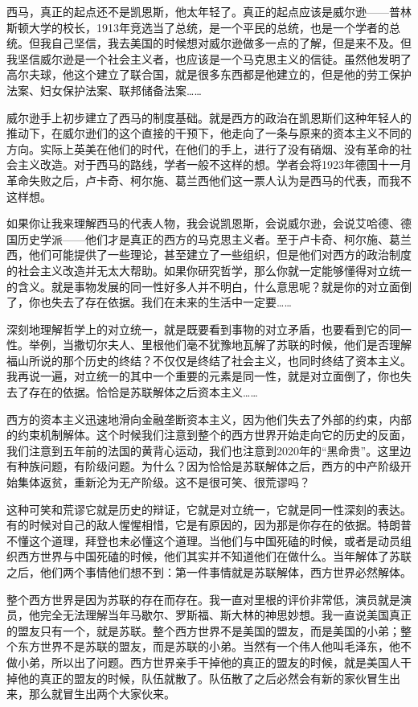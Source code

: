 \documentclass[UTF8, 12pt, a4paper]{ctexrep}
\begin{document}
西马，真正的起点还不是凯恩斯，他太年轻了。真正的起点应该是威尔逊——普林斯顿大学的校长，1913年竞选当了总统，是一个平民的总统，也是一个学者的总统。但我自己坚信，我去美国的时候想对威尔逊做多一点的了解，但是来不及。但我坚信威尔逊是一个社会主义者，也应该是一个马克思主义的信徒。虽然他发明了高尔夫球，他这个建立了联合国，就是很多东西都是他建立的，但是他的劳工保护法案、妇女保护法案、联邦储备法案……

威尔逊手上初步建立了西马的制度基础。就是西方的政治在凯恩斯们这种年轻人的推动下，在威尔逊们的这个直接的干预下，他走向了一条与原来的资本主义不同的方向。实际上英美在他们的时代，在他们的手上，进行了没有硝烟、没有革命的社会主义改造。对于西马的路线，学者一般不这样的想。学者会将1923年德国十一月革命失败之后，卢卡奇、柯尔施、葛兰西他们这一票人认为是西马的代表，而我不这样想。

如果你让我来理解西马的代表人物，我会说凯恩斯，会说威尔逊，会说艾哈德、德国历史学派——他们才是真正的西方的马克思主义者。至于卢卡奇、柯尔施、葛兰西，他们可能提供了一些理论，甚至建立了一些组织，但是他们对西方的政治制度的社会主义改造并无太大帮助。如果你研究哲学，那么你就一定能够懂得对立统一的含义。就是事物发展的同一性好多人并不明白，什么意思呢？就是你的对立面倒了，你也失去了存在依据。我们在未来的生活中一定要……

深刻地理解哲学上的对立统一，就是既要看到事物的对立矛盾，也要看到它的同一性。举例，当撒切尔夫人、里根他们毫不犹豫地瓦解了苏联的时候，他们是否理解福山所说的那个历史的终结？不仅仅是终结了社会主义，也同时终结了资本主义。我再说一遍，对立统一的其中一个重要的元素是同一性，就是对立面倒了，你也失去了存在的依据。恰恰是苏联解体之后资本主义……

西方的资本主义迅速地滑向金融垄断资本主义，因为他们失去了外部的约束，内部的约束机制解体。这个时候我们注意到整个的西方世界开始走向它的历史的反面，我们注意到五年前的法国的黄背心运动，我们也注意到2020年的“黑命贵”。这里边有种族问题，有阶级问题。为什么？因为恰恰是苏联解体之后，西方的中产阶级开始集体返贫，重新沦为无产阶级。这不是很可笑、很荒谬吗？

这种可笑和荒谬它就是历史的辩证，它就是对立统一，它就是同一性深刻的表达。有的时候对自己的敌人惺惺相惜，它是有原因的，因为那是你存在的依据。特朗普不懂这个道理，拜登也未必懂这个道理。当他们与中国死磕的时候，或者是动员组织西方世界与中国死磕的时候，他们其实并不知道他们在做什么。当年解体了苏联之后，他们两个事情他们想不到：第一件事情就是苏联解体，西方世界必然解体。

整个西方世界是因为苏联的存在而存在。我一直对里根的评价非常低，演员就是演员，他完全无法理解当年马歇尔、罗斯福、斯大林的神思妙想。我一直说美国真正的盟友只有一个，就是苏联。整个西方世界不是美国的盟友，而是美国的小弟；整个东方世界不是苏联的盟友，而是苏联的小弟。当然有一个伟人他叫毛泽东，他不做小弟，所以出了问题。西方世界亲手干掉他的真正的盟友的时候，就是美国人干掉他的真正的盟友的时候，队伍就散了。队伍散了之后必然会有新的家伙冒生出来，那么就冒生出两个大家伙来。
\end{document}

